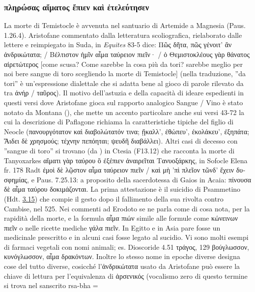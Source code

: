 {            \subsubsection{\textgreek{πληρώσας αἵματος ἔπιεν καὶ ἐτελεύτησεν}}\label{ref:morteditemistocle}
         La morte di Temistocle è avvenuta nel santuario di Artemide a Magnesia (Paus. 1.26.4). Aristofane  commentato dalla letteratura scoliografica, rielaborato dalle lettere e reimpiegato in Suda, in \emph{Equites} 83-5 dice: \textgreek{Πῶς δῆτα, πῶς γένοιτ’ ἂν ἀνδρικώτατα; / Βέλτιστον ἡμῖν αἷμα ταύρειον πιεῖν· / ὁ Θεμιστοκλέους γὰρ θάνατος αἱρετώτερος} [come scusa? Come sarebbe la cosa più da tori? sarebbe meglio per noi bere sangue di toro scegliendo la morte di Temistocle] (nella traduzione, ''da tori'' è un'espressione dialettale che si adatta bene al gioco di parole rilevato da \cite[232]{Arnould1993} tra \textgreek{ἀνήρ / ταῦρος}). Il motivo dell'astuzia e della capacità di ideare espedienti in questi versi dove Aristofane  gioca sul rapporto analogico Sangue / Vino è stato notato da Montana (\cite[264-5]{Montana2002}), che mette un accento particolare anche sui versi 43-72 la cui la descrizione di Paflagone richiama la caratteristiche tipiche del figlio di Neocle (\textgreek{πανουργότατον καὶ διαβολώτατόν τινα; ᾔκαλλ’, ἐθώπευ’, ἐκολάκευ’, ἐξηπάτα; Ἄιδει δὲ χρησμούς; τέχνην πεπόηται;  ψευδῆ διαβάλλει}). Altri casi di decesso con ''sangue di toro'' si trovano (da \cite[231]{Arnould1993}) in Ctesia (F13.12) che racconta la morte di Tanyoxarkes \textgreek{αἵματι γὰρ ταύρου ὃ ἐξέπιεν ἀναιρεῖται Τανυοξάρκης}, in Sofocle Elena fr. 178 Radt \textgreek{ἐμοὶ δὲ λῷστον αἷμα ταύρειον πιεῖν / καὶ μὴ ’πὶ πλεῖον τῶνδ’ ἔχειν δυσφημίας}, e Paus. 7.25.13: a proposito della sacerdotessa di Gaios in Acaia: \textgreek{πίνουσα δὲ αἷμα ταύρου δοκιμάζονται}. La prima attestazione è il suicidio di Psammetino (Hdt. \href{http://data.perseus.org/citations/urn:cts:greekLit:tlg0016.tlg001.perseus-grc1:3.15}{3.15}) che compie il gesto dopo il fallimento della sua rivolta contro Cambise, nel 525. Nei commenti ad Erodoto se ne parla come di cosa nota, per la rapidità della morte, e la formula \textgreek{αἷμα πιών} simile alle formule come \textgreek{κώνεινων πιεῖν} o nelle ricette mediche \textgreek{γάλα πιεῖν}. In Egitto e in Asia pare fosse un medicinale prescritto e in alcuni casi fosse legato al sucidio. Vi sono molti esempi di farmaci vegetali con nomi animali; es. Dioscoride 4.51 \textgreek{τράγος}, 129 \textgreek{βούγλωσσον, κυνόγλωσσον, αἷμα δρακόντων}. Inoltre lo stesso nome in epoche diverse designa cose del tutto diverse, cosicché l'\textgreek{ἀνδρικώτατα} usato da Aristofane  può essere la chiave di lettura per l'equivalenza di \textgreek{ἀρσενικός} (vocalismo zero di questo termine si trova nel sanscrito rsa-bha = }
